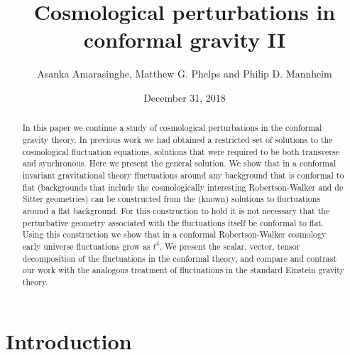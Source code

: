 \documentclass[aps]{revtex4}
\begin{document}
\allowdisplaybreaks
 
 \pagecolor[HTML]{282828}
 
 \makeatletter
 \newcommand{\globalcolor}[1]{%
 	\color[HTML]{#1}\global\let\default@color\current@color
 }
 \makeatother
 
\title{Cosmological perturbations in conformal gravity II}

\author{Asanka Amarasinghe, Matthew G. Phelps and Philip D. Mannheim}

\date{December 31, 2018}
\globalcolor{EBDBB2}
\begin{abstract}


In this paper we continue a study of cosmological perturbations in the conformal gravity theory. In previous work we had obtained a restricted set of solutions to the cosmological fluctuation equations, solutions that were required to be both transverse and synchronous. Here we present the general solution. We show that in a conformal invariant gravitational theory fluctuations around any background that is conformal to flat (backgrounds that include the cosmologically interesting Robertson-Walker and de Sitter geometries) can be constructed from the (known) solutions to fluctuations around a flat background. For this construction to hold it is not necessary that the perturbative geometry associated with the fluctuations itself be conformal to flat. Using this construction we show that in a conformal Robertson-Walker cosmology early universe fluctuations grow as $t^4$. We present the scalar, vector, tensor decomposition of the fluctuations in the conformal theory, and compare and contrast our work with the analogous treatment of fluctuations in the standard Einstein gravity theory.

\end{abstract}

\maketitle



\section{Introduction}
\label{S1}
\end{document}
